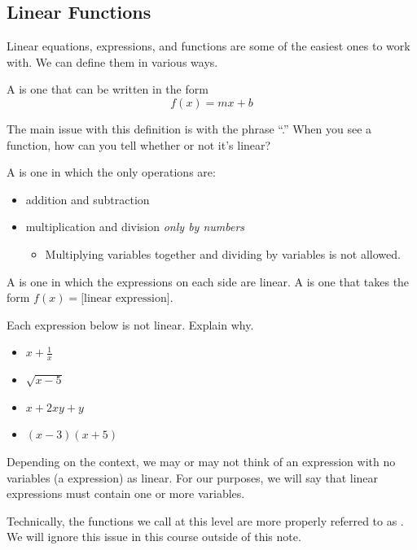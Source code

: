 \subsection{Linear Functions} 
Linear equations, expressions, and functions are some of the easiest ones to work with. We can define them in various ways.
\begin{definition}
A  is one that can be written in the form $$f(x)=mx+b$$
\end{definition}
The main issue with this definition is with the phrase ``\makeblank[1.75in].'' When you see a function, how can you tell whether or not it's linear?
\begin{definition}
A  is one in which the only operations are:
\begin{itemize}
\item addition and subtraction
\item multiplication and division \emph{only by numbers}
\begin{itemize}
\item Multiplying variables together and dividing by variables is not allowed.
\end{itemize}
\end{itemize}
A  is one in which the expressions on each side are linear. A  is one that takes the form $f(x)=\mbox{[linear expression]}$.
\end{definition}
\begin{Example}
Each expression below is not linear. Explain why.
\begin{itemize}
\item $x+\frac{1}{x}$\makeblanknewf
\item $\sqrt{x-5}$\makeblanknewf
\item $x+2xy+y$\makeblanknewf
\item $(x-3)(x+5)$\makeblanknewf
\end{itemize}
\end{Example}
\begin{Note}
Depending on the context, we may or may not think of an expression with no variables (a \makeblank[1in] expression) as linear. For our purposes, we will say that linear expressions must contain one or more variables.
\end{Note}
\begin{Note}
Technically, the functions we call  at this level are more properly referred to as . We will ignore this issue in this course outside of this note.
\end{Note}